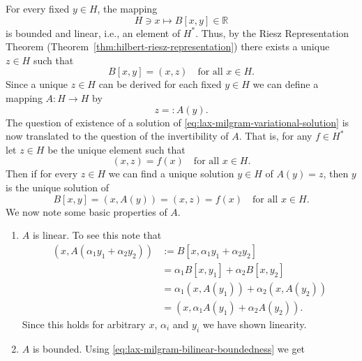 \begin{Proof}
For every fixed $y\in H$, the mapping
\begin{equation}\label{eq:lax-milgram-fixed-second-argument-functional}
H\ni x\mapsto B[x,y]\in\mathbb{R}
\end{equation}
is bounded and linear, i.e., an element of $H^*$. Thus, by the Riesz Representation Theorem (Theorem~\ref{thm:hilbert-riesz-representation}) there exists a unique $z\in H$ such that
\begin{equation}\label{eq:lax-milgram-riesz-representing-vector}
B[x,y]=(x,z)\quad\text{for all }x\in H.
\end{equation}
Since a unique $z\in H$ can be derived for each fixed $y\in H$ we can define a mapping $A:H\to H$ by
\begin{equation}\label{eq:lax-milgram-associated-operator-definition}
z=:A(y).
\end{equation}
The question of existence of a solution of \eqref{eq:lax-milgram-variational-solution} is now translated to the question of the invertibility of $A$. That is, for any $f\in H^*$ let $z\in H$ be the unique element such that
\begin{equation}\label{eq:lax-milgram-data-riesz-representative}
(x,z)=f(x)\quad\text{for all }x\in H.
\end{equation}
Then if for every $z\in H$ we can find a unique solution $y\in H$ of $A(y)=z$, then $y$ is the unique solution of
\begin{equation}\label{eq:lax-milgram-operator-equation-equivalence}
B[x,y]=(x,A(y))=(x,z)=f(x)\quad\text{for all }x\in H.
\end{equation}
We now note some basic properties of $A$.\begin{enumerate}\item $A$ is linear. To see this note that\[\begin{aligned}
(x,A(\alpha_1y_1+\alpha_2y_2))&:=B[x,\alpha_1y_1+\alpha_2y_2]\\
&=\alpha_1B[x,y_1]+\alpha_2B[x,y_2]\\
&=\alpha_1(x,A(y_1))+\alpha_2(x,A(y_2))\\
&=(x,\alpha_1A(y_1)+\alpha_2A(y_2)).
\end{aligned}\]Since this holds for arbitrary $x$, $\alpha_i$ and $y_i$ we have shown linearity.\item $A$ is bounded. Using \eqref{eq:lax-milgram-bilinear-boundedness} we get
\begin{equation}\label{eq:lax-milgram-associated-operator-norm-calculation}

\end{equation}
\end{enumerate}
\end{Proof}
